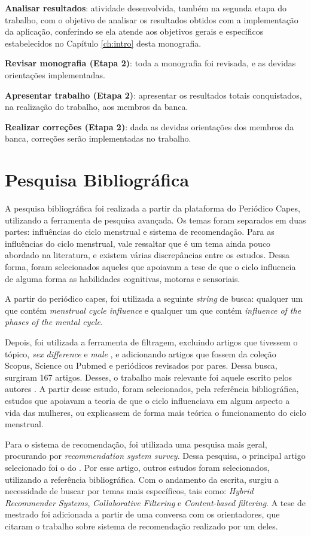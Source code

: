 \textbf{Analisar resultados}: atividade desenvolvida, também na segunda etapa do trabalho, 
com o objetivo de
analisar os resultados obtidos com a implementação da aplicação, conferindo se ela atende 
aos objetivos gerais e específicos estabelecidos no Capítulo \ref{ch:intro} desta monografia.

\textbf{Revisar monografia (Etapa 2)}: toda a monografia foi revisada, e as devidas orientações implementadas.
 
\textbf{Apresentar trabalho (Etapa 2)}: apresentar os resultados totais conquistados, na 
realização do trabalho, aos membros da banca.

\textbf{Realizar correções (Etapa 2)}: dada as devidas orientações dos membros da banca, correções 
serão implementadas no trabalho.

\section{Pesquisa Bibliográfica}
\label{43}

A pesquisa bibliográfica foi realizada a partir da plataforma do Periódico Capes, utilizando a ferramenta de pesquisa avançada.
Os temas foram separados em duas partes: influências do ciclo menstrual e sistema de recomendação.
Para as influências do ciclo menstrual, vale ressaltar que é um tema ainda pouco abordado na literatura, e existem 
várias discrepâncias entre os estudos. Dessa forma, foram selecionados aqueles que apoiavam a tese de que 
o ciclo influencia de alguma forma as habilidades cognitivas, motoras e sensoriais. 

A partir do periódico capes, foi utilizada a seguinte \emph{string} de busca:
qualquer um que contém \emph{menstrual cycle influence} e qualquer um que contém 
\emph{influence of the phases of the mental cycle}. 

Depois, foi utilizada a ferramenta de filtragem, excluindo artigos que tivessem o tópico, \emph{sex difference} e \emph{male}
, e adicionando artigos que fossem da coleção Scopus, Science ou Pubmed e periódicos revisados por pares. Dessa busca, surgiram 167 artigos.
Desses, o trabalho mais relevante foi aquele escrito pelos autores . A partir desse estudo, foram selecionados, pela referência bibliográfica, estudos que apoiavam 
a teoria de que o ciclo influenciava em algum aspecto a vida das mulheres, ou explicassem de forma mais teórica o funcionamento do ciclo menstrual.


Para o sistema de recomendação, foi utilizada uma pesquisa mais geral, procurando por \emph{recommendation system survey}. Dessa pesquisa, o principal artigo selecionado foi o 
do . Por esse artigo, outros estudos foram selecionados, utilizando a referência bibliográfica. Com o andamento da escrita, surgiu a necessidade de buscar
por temas mais específicos, tais como: \emph{Hybrid Recommender Systems}, \emph{Collaborative Filtering} e \emph{Content-based filtering}. A tese de mestrado \cite{mauricio} foi adicionada a partir 
de uma conversa com os orientadores, que citaram o trabalho sobre sistema de recomendação realizado por um deles.


